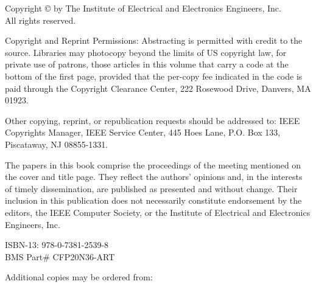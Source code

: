 \cleardoublepage
\thispagestyle{empty}
\begin{center}
Copyright \copyright{} \the\year{}
by The Institute of Electrical and Electronics Engineers, Inc.\\
All rights reserved.
\end{center}

Copyright and Reprint Permissions: Abstracting is permitted with credit to the source. Libraries may photocopy beyond the limits of US copyright law, for private use of patrons, those articles in this volume that carry a code at the bottom of the first page, provided that the per-copy fee indicated in the code is paid through the Copyright Clearance Center, 222 Rosewood Drive, Danvers, MA 01923.

Other copying, reprint, or republication requests should be addressed to: IEEE Copyrights Manager, IEEE Service Center, 445 Hoes Lane, P.O. Box 133, Piscataway, NJ 08855-1331.

The papers in this book comprise the proceedings of the meeting mentioned on the cover and title page. They reflect the authors’ opinions and, in the interests of timely dissemination, are published as presented and without change. Their inclusion in this publication does not necessarily constitute endorsement by the editors, the IEEE Computer Society, or the Institute of Electrical and Electronics Engineers, Inc.

\begin{center}
ISBN-13: 978-0-7381-2539-8\\
BMS Part\# CFP20N36-ART
\end{center}

\begin{center}
Additional copies may be ordered from:
\end{center}

